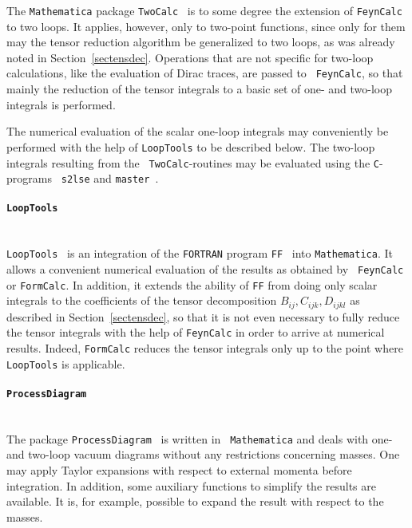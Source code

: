 The {\tt Mathematica} package {\tt TwoCalc}~\cite{WeiSchBoe94} is to
some degree the extension of {\tt FeynCalc} to two loops. It applies,
however, only to two-point functions, since only for them may the tensor
reduction algorithm be generalized to two loops, as was already noted in
Section~\ref{sectensdec}.  Operations that are not specific for two-loop
calculations, like the evaluation of Dirac traces, are passed to {\tt
  FeynCalc}, so that mainly the reduction of the tensor integrals to a
basic set of one- and two-loop integrals is performed.

The numerical evaluation of the scalar one-loop integrals may
conveniently be performed with the help of {\tt LoopTools} to be
described below. The two-loop integrals resulting from the {\tt
  TwoCalc}-routines may be evaluated using the {\tt C}-programs {\tt
  s2lse} and {\tt master}~\cite{Bauetal}.

\pagebreak[4]

\paragraph{{\tt LoopTools}}\mbox{}\\[1em]
%
{\tt LoopTools}~\cite{FormCalc} is an integration of the {\tt FORTRAN}
program {\tt FF}~\cite{ffmanual} into {\tt Mathematica}. It allows a
convenient numerical evaluation of the results as obtained by {\tt
  FeynCalc} or {\tt FormCalc}. In addition, it extends the ability of
{\tt FF} from doing only scalar integrals to the coefficients of the
tensor decomposition $B_{ij}, C_{ijk}, D_{ijkl}$ as described in
Section~\ref{sectensdec}, so that it is not even necessary to fully
reduce the tensor integrals with the help of {\tt FeynCalc} in order to
arrive at numerical results.  Indeed, {\tt FormCalc} reduces the tensor
integrals only up to the point where {\tt LoopTools} is applicable.


\paragraph{{\tt ProcessDiagram}}\mbox{}\\[1em]
%
The package {\tt ProcessDiagram}~\cite{ProcDia} is written in {\tt
  Mathematica} and deals with one- and two-loop vacuum diagrams without
any restrictions concerning masses. One may apply Taylor expansions with
respect to external momenta before integration.  In addition, some
auxiliary functions to simplify the results are available. It is, for
example, possible to expand the result with respect to the masses.

